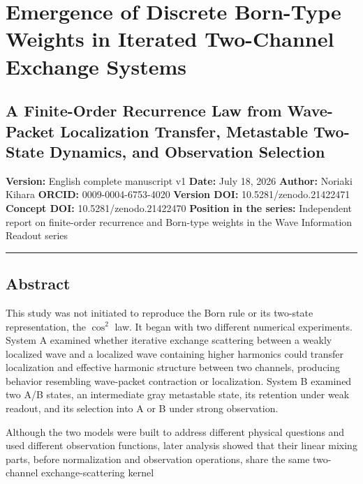 \documentclass[
  a4paper,
  10pt]{article}
\author{}
\date{}
\begin{document}
\section{Emergence of Discrete Born-Type Weights in Iterated Two-Channel
Exchange
Systems}\label{emergence-of-discrete-born-type-weights-in-iterated-two-channel-exchange-systems}

\subsection{A Finite-Order Recurrence Law from Wave-Packet Localization
Transfer, Metastable Two-State Dynamics, and Observation
Selection}\label{a-finite-order-recurrence-law-from-wave-packet-localization-transfer-metastable-two-state-dynamics-and-observation-selection}

\textbf{Version:} English complete manuscript v1 \textbf{Date:} July 18,
2026 \textbf{Author:} Noriaki Kihara \textbf{ORCID:} 0009-0004-6753-4020
\textbf{Version DOI:} 10.5281/zenodo.21422471 \textbf{Concept DOI:}
10.5281/zenodo.21422470 \textbf{Position in the series:} Independent
report on finite-order recurrence and Born-type weights in the Wave
Information Readout series

\begin{center}\rule{0.5\linewidth}{0.5pt}\end{center}

\subsection{Abstract}\label{abstract}

This study was not initiated to reproduce the Born rule or its two-state
representation, the \(\cos^2\) law. It began with two different
numerical experiments. System A examined whether iterative exchange
scattering between a weakly localized wave and a localized wave
containing higher harmonics could transfer localization and effective
harmonic structure between two channels, producing behavior resembling
wave-packet contraction or localization. System B examined two A/B
states, an intermediate gray metastable state, its retention under weak
readout, and its selection into A or B under strong observation.

Although the two models were built to address different physical
questions and used different observation functions, later analysis
showed that their linear mixing parts, before normalization and
observation operations, share the same two-channel exchange-scattering
kernel
\end{document}
